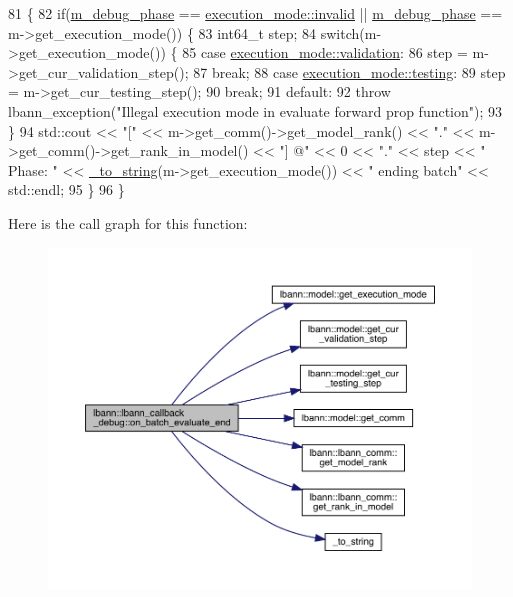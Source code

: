 \begin{DoxyCode}
81                                                               \{
82   \textcolor{keywordflow}{if}(\hyperlink{classlbann_1_1lbann__callback__debug_acc66ab699534e42aa958148f1fb3fd6f}{m\_debug\_phase} == \hyperlink{base_8hpp_a2781a159088df64ed7d47cc91c4dc0a8afedb2d84cafe20862cb4399751a8a7e3}{execution\_mode::invalid} || 
      \hyperlink{classlbann_1_1lbann__callback__debug_acc66ab699534e42aa958148f1fb3fd6f}{m\_debug\_phase} == m->get\_execution\_mode()) \{
83     int64\_t step;
84     \textcolor{keywordflow}{switch}(m->get\_execution\_mode()) \{
85     \textcolor{keywordflow}{case} \hyperlink{base_8hpp_a2781a159088df64ed7d47cc91c4dc0a8aa617908b172c473cb8e8cda059e55bf0}{execution\_mode::validation}:
86       step = m->get\_cur\_validation\_step();
87       \textcolor{keywordflow}{break};
88     \textcolor{keywordflow}{case} \hyperlink{base_8hpp_a2781a159088df64ed7d47cc91c4dc0a8aae2b1fca515949e5d54fb22b8ed95575}{execution\_mode::testing}:
89       step = m->get\_cur\_testing\_step();
90       \textcolor{keywordflow}{break};
91     \textcolor{keywordflow}{default}:
92       \textcolor{keywordflow}{throw} lbann\_exception(\textcolor{stringliteral}{"Illegal execution mode in evaluate forward prop function"});
93     \}
94     std::cout << \textcolor{stringliteral}{"["} << m->get\_comm()->get\_model\_rank() << \textcolor{stringliteral}{"."} << m->get\_comm()->get\_rank\_in\_model() << \textcolor{stringliteral}{"]
       @"} << 0 << \textcolor{stringliteral}{"."} << step << \textcolor{stringliteral}{" Phase: "} << \hyperlink{base_8hpp_adeeaddd10bd31df0cae7cb0fcae45d5c}{\_to\_string}(m->get\_execution\_mode()) << \textcolor{stringliteral}{" ending batch"} << 
      std::endl;
95   \}
96 \}
\end{DoxyCode}
Here is the call graph for this function\+:\nopagebreak
\begin{figure}[H]
\begin{center}
\leavevmode
\includegraphics[width=350pt]{classlbann_1_1lbann__callback__debug_a07a02eb525ebe9c06b361c48fc2977c8_cgraph}
\end{center}
\end{figure}
